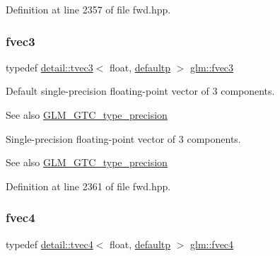 Definition at line 2357 of file fwd.\+hpp.

\mbox{\label{group__gtc__type__precision_ga33b85a14a8f68ec99029ff13db6af369}} 
\subsubsection{\texorpdfstring{fvec3}{fvec3}}
{\footnotesize\ttfamily typedef \hyperlink{structglm_1_1detail_1_1tvec3}{detail\+::tvec3}$<$ float, \hyperlink{namespaceglm_a0f04f086094c747d227af4425893f545a9d21ccd8b5a009ec7eb7677befc3bf51}{defaultp} $>$ \hyperlink{group__gtc__type__precision_ga33b85a14a8f68ec99029ff13db6af369}{glm\+::fvec3}}

Default single-\/precision floating-\/point vector of 3 components. \begin{DoxySeeAlso}{See also}
\hyperlink{group__gtc__type__precision}{G\+L\+M\+\_\+\+G\+T\+C\+\_\+type\+\_\+precision}
\end{DoxySeeAlso}
Single-\/precision floating-\/point vector of 3 components. \begin{DoxySeeAlso}{See also}
\hyperlink{group__gtc__type__precision}{G\+L\+M\+\_\+\+G\+T\+C\+\_\+type\+\_\+precision} 
\end{DoxySeeAlso}


Definition at line 2361 of file fwd.\+hpp.

\mbox{\label{group__gtc__type__precision_ga55d1365630d3b3ecf7c7f4e7c29a9cb1}} 
\subsubsection{\texorpdfstring{fvec4}{fvec4}}
{\footnotesize\ttfamily typedef \hyperlink{structglm_1_1detail_1_1tvec4}{detail\+::tvec4}$<$ float, \hyperlink{namespaceglm_a0f04f086094c747d227af4425893f545a9d21ccd8b5a009ec7eb7677befc3bf51}{defaultp} $>$ \hyperlink{group__gtc__type__precision_ga55d1365630d3b3ecf7c7f4e7c29a9cb1}{glm\+::fvec4}}


